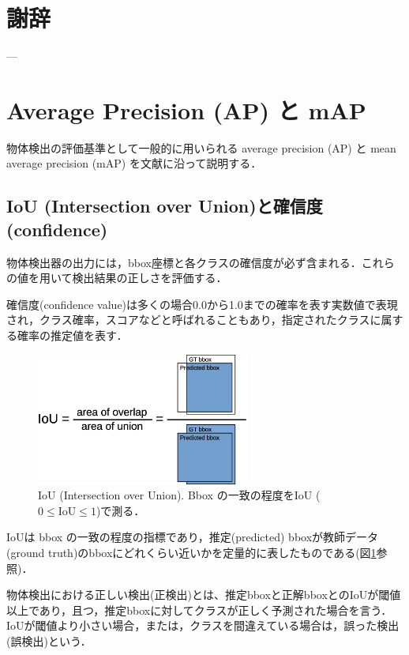 \documentclass[twocolumn]{jsarticle} %
\begin{document}
\section*{謝辞}
---

\footnotesize

%


\appendix

\section{Average Precision (AP) と mAP}
物体検出の評価基準として一般的に用いられる average precision (AP) と mean average precision (mAP) を文献\cite{PNS20}に沿って説明する．

\subsection{IoU (Intersection over Union)と確信度(confidence)}
物体検出器の出力には，bbox座標と各クラスの確信度が必ず含まれる．これらの値を用いて検出結果の正しさを評価する．

確信度(confidence value)は多くの場合0.0から1.0までの確率を表す実数値で表現され，クラス確率，スコアなどと呼ばれることもあり，指定されたクラスに属する確率の推定値を表す．

\begin{figure}[tb]
    \centering
    \includegraphics[width=7cm,clip]{fig/IoU.eps}
    \caption{ IoU (Intersection over Union). Bbox の一致の程度をIoU ($0{\leq}\mbox{IoU}{\leq}1$)で測る．}
    \label{fig:IoU}
\end{figure}
IoUは bbox の一致の程度の指標であり，推定(predicted) bboxが教師データ(ground truth)のbboxにどれくらい近いかを定量的に表したものである(図\ref{fig:IoU}参照)．

物体検出における正しい検出(正検出)とは、推定bboxと正解bboxとのIoUが閾値以上であり，且つ，推定bboxに対してクラスが正しく予測された場合を言う．
IoUが閾値より小さい場合，または，クラスを間違えている場合は，誤った検出(誤検出)という．
\end{document}
